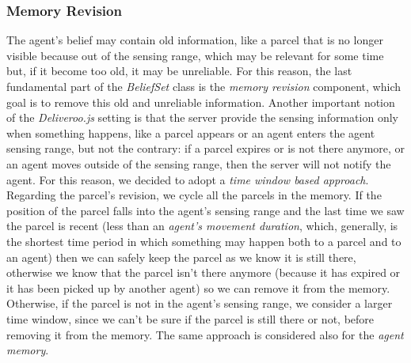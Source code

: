         \subsubsection{Memory Revision}
            The agent's belief may contain old information, like a parcel that is no longer visible because out of the sensing range, which may be relevant for some time but, if it become too old, it may be unreliable. For this reason, the last fundamental part of the \textit{BeliefSet} class is the \textit{memory revision} component, which goal is to remove this old and unreliable information. Another important notion of the \textit{Deliveroo.js} setting is that the server provide the sensing information only when something happens, like a parcel appears or an agent enters the agent sensing range, but not the contrary: if a parcel expires or is not there anymore, or an agent moves outside of the sensing range, then the server will not notify the agent. For this reason, we decided to adopt a \textit{time window based approach}.
            \medskip\\
            Regarding the parcel's revision, we cycle all the parcels in the memory. If the position of the parcel falls into the agent's sensing range and the last time we saw the parcel is recent (less than an \textit{agent's movement duration}, which, generally, is the shortest time period in which something may happen both to a parcel and to an agent) then we can safely keep the parcel as we know it is still there, otherwise we know that the parcel isn't there anymore (because it has expired or it has been picked up by another agent) so we can remove it from the memory. Otherwise, if the parcel is not in the agent's sensing range, we consider a larger time window, since we can't be sure if the parcel is still there or not, before removing it from the memory. The same approach is considered also for the \textit{agent memory}.

